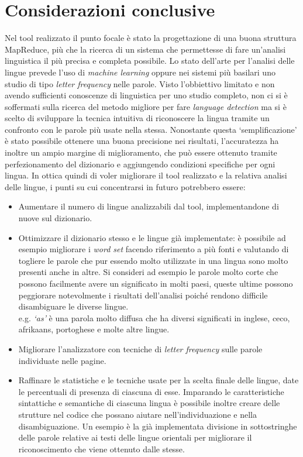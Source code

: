 \documentclass{article}
\newcommand{\MR}{MapReduce}
\begin{document}
\section{Considerazioni conclusive}
Nel tool realizzato il punto focale è stato la progettazione di una buona struttura \MR{}, più che la ricerca di un sistema che permettesse di fare un'analisi linguistica il più precisa e completa possibile. Lo stato dell'arte per l'analisi delle lingue prevede l'uso di \textit{machine learning} oppure nei sistemi più basilari uno studio di tipo \textit{letter frequency} nelle parole. Visto l'obbiettivo limitato e non avendo sufficienti conoscenze di linguistica per uno studio completo, non ci si è soffermati sulla ricerca del metodo migliore per fare \textit{language detection} ma si è scelto di sviluppare la tecnica intuitiva di riconoscere la lingua tramite un confronto con le parole più usate nella stessa. Nonostante questa `semplificazione' è stato possibile ottenere una buona precisione nei risultati, l'accuratezza ha inoltre un ampio margine di miglioramento, che può essere ottenuto tramite perfezionamento del dizionario e aggiungendo condizioni specifiche per ogni lingua. In ottica quindi di voler migliorare il tool realizzato e la relativa analisi delle lingue, i punti su cui concentrarsi in futuro potrebbero essere:
\begin{itemize}
    \item Aumentare il numero di lingue analizzabili dal tool, implementandone di nuove sul dizionario.
    \item Ottimizzare il dizionario stesso e le lingue già implementate: è possibile ad esempio migliorare i \textit{word set} facendo riferimento a più fonti e valutando di togliere le parole che pur essendo molto utilizzate in una lingua sono molto presenti anche in altre. Si consideri ad esempio le parole molto corte che possono facilmente avere un significato in molti paesi, queste ultime possono peggiorare notevolmente i risultati dell'analisi poiché rendono difficile disambiguare le diverse lingue.\\
    e.g. \textit{`as'} è una parola molto diffusa che ha diversi significati in inglese, ceco, afrikaans, portoghese e molte altre lingue.
    \item Migliorare l'analizzatore con tecniche di \textit{letter frequency} sulle parole individuate nelle pagine.
    \item Raffinare le statistiche e le tecniche usate per la scelta finale delle lingue, date le percentuali di presenza di ciascuna di esse. Imparando le caratteristiche sintattiche e semantiche di ciascuna lingua è possibile inoltre creare delle strutture nel codice che possano aiutare nell'individuazione e nella disambiguazione. Un esempio è la già implementata divisione in sottostringhe delle parole relative ai testi delle lingue orientali per migliorare il riconoscimento che viene ottenuto dalle stesse.
\end{itemize}
\end{document}
